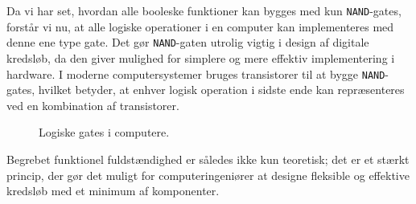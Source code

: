 Da vi har set, hvordan alle booleske funktioner kan bygges med kun \texttt{NAND}-gates, forstår vi nu, at alle logiske operationer i en computer kan implementeres med denne ene type gate. Det gør \texttt{NAND}-gaten utrolig vigtig i design af digitale kredsløb, da den giver mulighed for simplere og mere effektiv implementering i hardware. I moderne computersystemer bruges transistorer til at bygge \texttt{NAND}-gates, hvilket betyder, at enhver logisk operation i sidste ende kan repræsenteres ved en kombination af transistorer.

\begin{figure}[h!]
    \centering
    \caption{Logiske gates i computere.}
    \label{fig:logincom}
\end{figure}

Begrebet funktionel fuldstændighed er således ikke kun teoretisk; det er et stærkt princip, der gør det muligt for computeringeniører at designe fleksible og effektive kredsløb med et minimum af komponenter.
